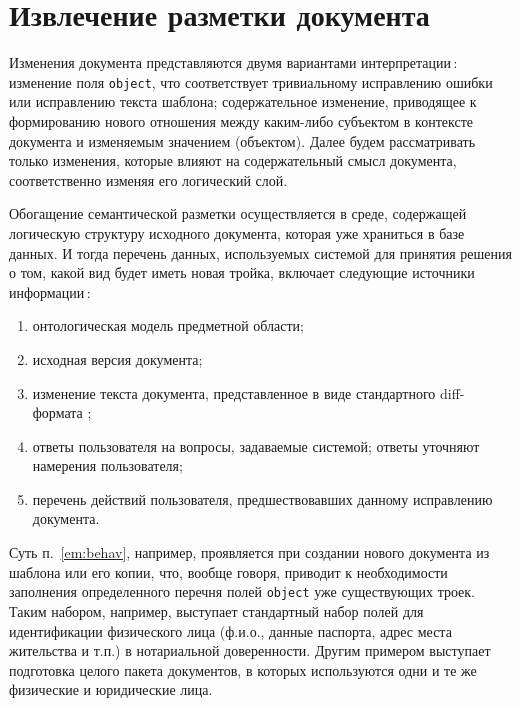 \documentclass[utf8]{../IncArticle}
\begin{document}
\section{Извлечение разметки документа} \label{sec:markupproc}

Изменения документа представляются двумя вариантами интерпретации\,:
изменение поля \texttt{object}, что соответствует тривиальному
исправлению ошибки или исправлению текста шаблона; содержательное
изменение, приводящее к формированию нового отношения между каким-либо
субъектом в контексте документа и изменяемым значением (объектом).
Далее будем рассматривать только изменения, которые влияют на
содержательный смысл документа, соответственно изменяя его логический
слой.

Обогащение семантической разметки осуществляется в среде, содержащей
логическую структуру исходного документа, которая уже храниться в базе
данных.  И тогда перечень данных, используемых системой для принятия
решения о том, какой вид будет иметь новая тройка, включает следующие
источники информации\,:
\begin{enumerate}
\item онтологическая модель предметной области;
\item исходная версия документа;
\item изменение текста документа, представленное в виде стандартного
  diff-формата \cite{diff};
\item ответы пользователя на вопросы, задаваемые системой; ответы
  уточняют намерения пользователя;
\item перечень действий пользователя, предшествовавших данному
  исправлению документа. \label{em:behav}
\end{enumerate}
Суть п.~\ref{em:behav}, например, проявляется при создании нового
документа из шаблона или его копии, что, вообще говоря, приводит к
необходимости заполнения определенного перечня полей \texttt{object}
уже существующих троек.  Таким набором, например, выступает
стандартный набор полей для идентификации физического лица (ф.и.о.,
данные паспорта, адрес места жительства и т.п.) в нотариальной
доверенности.  Другим примером выступает подготовка целого пакета
документов, в которых используются одни и те же физические и
юридические лица.
\end{document}
